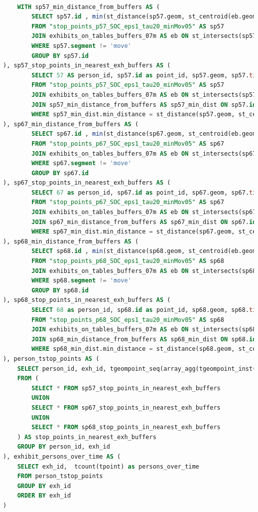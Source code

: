 \documentclass[12pt]{article}
\begin{document}
\begin{lstlisting}[language=SQL,
    deletekeywords={IDENTITY,INT},
    morekeywords={clustered},    
    framesep=10pt,
    framextopmargin=10pt]

    WITH sp57_min_distance_from_buffers AS (
		SELECT sp57.id , min(st_distance(sp57.geom, st_centroid(eb.geom))) as min_distance
		FROM "stop_points_p57_SOC_eps1_tau20_minMov05" AS sp57 
		JOIN exhibits_on_tables_buffers_07m AS eb ON st_intersects(sp57.geom, eb.geom)
		WHERE sp57.segment != 'move'
		GROUP BY sp57.id
), sp57_stop_points_in_nearest_exh_buffers AS (
		SELECT 57 AS person_id, sp57.id as point_id, sp57.geom, sp57.timestamp, eb.id as exh_id, st_distance(sp57.geom, st_centroid(eb.geom)) as distance_from_centroid
		FROM "stop_points_p57_SOC_eps1_tau20_minMov05" AS sp57 
		JOIN exhibits_on_tables_buffers_07m AS eb ON st_intersects(sp57.geom, eb.geom)
		JOIN sp57_min_distance_from_buffers AS sp57_min_dist ON sp57.id = sp57_min_dist.id
		WHERE sp57_min_dist.min_distance = st_distance(sp57.geom, st_centroid(eb.geom))
), sp67_min_distance_from_buffers AS (
		SELECT sp67.id , min(st_distance(sp67.geom, st_centroid(eb.geom))) as min_distance
		FROM "stop_points_p67_SOC_eps1_tau20_minMov05" AS sp67 
		JOIN exhibits_on_tables_buffers_07m AS eb ON st_intersects(sp67.geom, eb.geom)
		WHERE sp67.segment != 'move'
		GROUP BY sp67.id
), sp67_stop_points_in_nearest_exh_buffers AS (
		SELECT 67 as person_id, sp67.id as point_id, sp67.geom, sp67.timestamp, eb.id as exh_id, st_distance(sp67.geom, st_centroid(eb.geom)) as distance_from_centroid
		FROM "stop_points_p67_SOC_eps1_tau20_minMov05" AS sp67 
		JOIN exhibits_on_tables_buffers_07m AS eb ON st_intersects(sp67.geom, eb.geom)
		JOIN sp67_min_distance_from_buffers AS sp67_min_dist ON sp67.id = sp67_min_dist.id
		WHERE sp67_min_dist.min_distance = st_distance(sp67.geom, st_centroid(eb.geom))
), sp68_min_distance_from_buffers AS (
		SELECT sp68.id , min(st_distance(sp68.geom, st_centroid(eb.geom))) as min_distance
		FROM "stop_points_p68_SOC_eps1_tau20_minMov05" AS sp68 
		JOIN exhibits_on_tables_buffers_07m AS eb ON st_intersects(sp68.geom, eb.geom)
		WHERE sp68.segment != 'move'
		GROUP BY sp68.id
), sp68_stop_points_in_nearest_exh_buffers AS (
		SELECT 68 as person_id, sp68.id as point_id, sp68.geom, sp68.timestamp, eb.id as exh_id, st_distance(sp68.geom, st_centroid(eb.geom)) as distance_from_centroid
		FROM "stop_points_p68_SOC_eps1_tau20_minMov05" AS sp68 
		JOIN exhibits_on_tables_buffers_07m AS eb ON st_intersects(sp68.geom, eb.geom)
		JOIN sp68_min_distance_from_buffers AS sp68_min_dist ON sp68.id = sp68_min_dist.id
		WHERE sp68_min_dist.min_distance = st_distance(sp68.geom, st_centroid(eb.geom))
), person_tstop_points AS (
    SELECT person_id, exh_id, tgeompoint_seq(array_agg(tgeompoint_inst(geom, timestamp) ORDER BY timestamp)) AS tpoint
    FROM (
        SELECT * FROM sp57_stop_points_in_nearest_exh_buffers 
        UNION 
        SELECT * FROM sp67_stop_points_in_nearest_exh_buffers
        UNION
        SELECT * FROM sp68_stop_points_in_nearest_exh_buffers
    ) AS stop_points_in_nearest_exh_buffers
    GROUP BY person_id, exh_id
), exhibit_persons_over_time AS (
    SELECT exh_id,  tcount(tpoint) as persons_over_time
    FROM person_tstop_points
    GROUP BY exh_id
    ORDER BY exh_id
)


\end{lstlisting}
\end{document}

